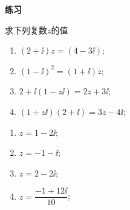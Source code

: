 \begin{exercise}{\bf 练习}
\begin{answer}
\begin{enumerate}[itemindent=1em,listparindent=6em, label=\arabic*)]
        \end{enumerate}
      \end{answer}
    \item 求下列复数$z$的值
      \begin{enumerate}[label=\arabic*)]
        \item $(2+\ii)z=(4-3\ii)$;
        \vspace{2cm}
        \item $(1-\ii)^2=(1+\ii)z$;
        \vspace{2cm}
        \item $2+\ii(1-z\ii)=2z+3\ii$;
        \vspace{2cm}
        \item $(1+z\ii)(2+\ii)=3z-4\ii$;
        \vspace{2cm}
      \end{enumerate}
      \begin{answer}
        \begin{enumerate}[itemindent=1em,listparindent=6em, label=\arabic*)]
          \item $z=1-2\ii$;
          \item $z=-1-\ii$;
          \item $z=2-2\ii$;
          \item $z=\dfrac{-1+12\ii}{10}$;
        \end{enumerate}
      \end{answer}
    \end{exercise}

